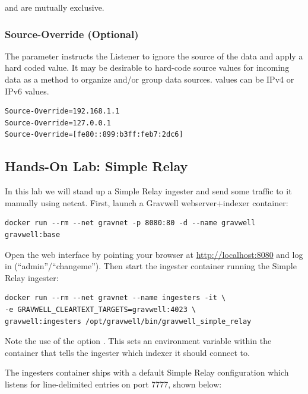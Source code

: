  and  are mutually
exclusive.

\subsubsection*{Source-Override (Optional)}

The  parameter instructs the Listener to ignore the
source of the data and apply a hard coded value. It may be desirable to
hard-code source values for incoming data as a method to organize and/or
group data sources.  values can be IPv4 or IPv6
values.

\begin{Verbatim}[breaklines=true]
Source-Override=192.168.1.1
Source-Override=127.0.0.1
Source-Override=[fe80::899:b3ff:feb7:2dc6]
\end{Verbatim}

\subsection{Hands-On Lab: Simple Relay}

In this lab we will stand up a Simple Relay ingester and send some
traffic to it manually using netcat. First, launch a Gravwell
webserver+indexer container:

\begin{Verbatim}[breaklines=true]
docker run --rm --net gravnet -p 8080:80 -d --name gravwell gravwell:base
\end{Verbatim}

Open the web interface by pointing your browser at \href{http://localhost:8080/}{http://localhost:8080} and log in (``admin''/``changeme''). Then start the ingester container running the Simple Relay ingester:

\begin{Verbatim}[breaklines=true]
docker run --rm --net gravnet --name ingesters -it \
-e GRAVWELL_CLEARTEXT_TARGETS=gravwell:4023 \
gravwell:ingesters /opt/gravwell/bin/gravwell_simple_relay
\end{Verbatim}

Note the use of the option .
This sets an environment
variable within the container that tells the ingester which indexer it
should connect to.

The ingesters container ships with a default Simple Relay configuration
which listens for line-delimited entries on port 7777, shown below:


